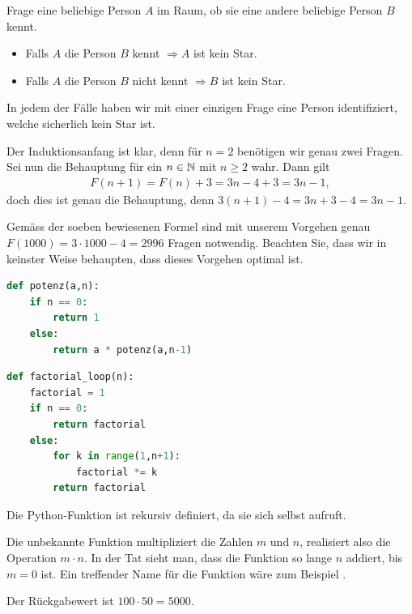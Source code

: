 \begin{myanswer}[myexercise:0351]
  Frage eine beliebige Person $A$ im Raum, ob sie eine andere beliebige Person $B$ kennt.
\begin{itemize}
    \item Falls $A$ die Person $B$ kennt $\Rightarrow A$ ist kein Star.
    \item Falls $A$ die Person $B$ nicht kennt $\Rightarrow B$ ist kein Star.
\end{itemize}
In jedem der Fälle haben wir mit einer einzigen Frage eine Person identifiziert, welche sicherlich kein Star ist.
\end{myanswer}


\begin{myanswer}[myexercise:0352]
Der Induktionsanfang ist klar, denn für $n = 2$ benötigen wir genau zwei Fragen. Sei nun die Behauptung für ein $n\in\mathbb{N}$ mit $n\geq 2$ wahr. Dann gilt
\begin{align*}
    F(n+1) = F(n) + 3 = 3n-4 + 3 = 3n - 1,
\end{align*}
doch dies ist genau die Behauptung, denn $3(n+1)-4 = 3n+3-4=3n-1$.

Gemäss der soeben bewiesenen Formel sind mit unserem Vorgehen genau $F(1000) = 3\cdot 1000 - 4 = 2996$ Fragen notwendig. Beachten Sie, dass wir in keinster Weise behaupten, dass dieses Vorgehen optimal ist.
\end{myanswer}

\clearpage

\begin{myanswer}[myexercise:0303]
\begin{lstlisting}[language=Python,caption=rekursive Potenz-Funktion]
def potenz(a,n):
    if n == 0:
        return 1
    else:
        return a * potenz(a,n-1)
\end{lstlisting}
\end{myanswer}


\begin{myanswer}[myexercise:0302]
\begin{lstlisting}[language=Python,caption=rekursive Potenz-Funktion]
def factorial_loop(n):
    factorial = 1
    if n == 0:
        return factorial
    else:
        for k in range(1,n+1):
            factorial *= k
        return factorial
\end{lstlisting}
\end{myanswer}
\clearpage

\begin{myanswer}[myexercise:0304]
\begin{aenum}
    \item Die Python-Funktion ist rekursiv definiert, da sie sich selbst aufruft.
    \item Die unbekannte Funktion multipliziert die Zahlen $m$ und $n$, realisiert also die Operation $m\cdot n$. In der Tat sieht man, dass die Funktion so lange $n$ addiert, bis $m = 0$ ist. Ein treffender Name für die Funktion wäre zum Beispiel .
    \item Der Rückgabewert ist $100\cdot 50 = 5000$.
\end{aenum}
\end{myanswer}


